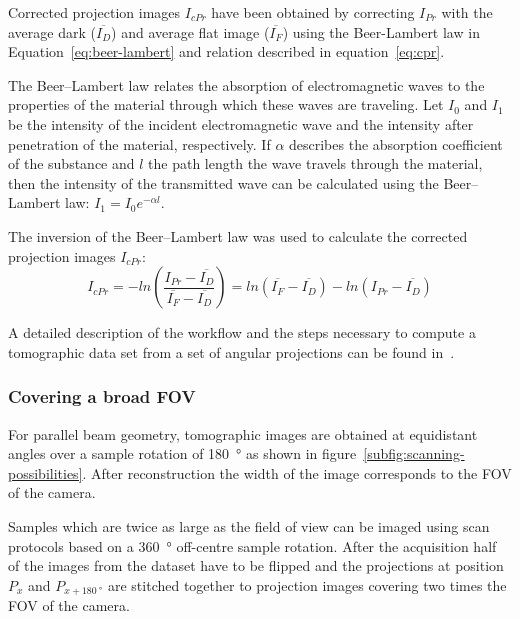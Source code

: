Corrected projection images $I_{cPr}$ have been obtained by correcting $I_{Pr}$ with the average dark ($\overline{I_{D}}$) and average flat image ($\overline{I_{F}}$) using the Beer-Lambert law in Equation~\ref{eq:beer-lambert} and relation described in equation~\ref{eq:cpr}.

The Beer--Lambert law relates the absorption of electromagnetic waves to the properties of the material through which these waves are traveling. Let $I_{0}$ and $I_{1}$ be the intensity of the incident electromagnetic wave and the intensity after penetration of the material, respectively. If $\alpha$ describes the absorption coefficient of the substance and $l$ the path length the wave travels through the material, then the intensity of the transmitted wave can be calculated using the Beer--Lambert law: \(I_{1}=I_{0}e^{-\alpha l}\label{eq:beer-lambert}\).

The inversion of the Beer--Lambert law was used to calculate the corrected projection images $I_{cPr}$:
\begin{equation}
	I_{cPr} = -ln\left(\frac{I_{Pr}-\overline{I_{D}}}{\overline{I_{F}}-\overline{I_{D}}}\right)
	= ln(\overline{I_{F}}-\overline{I_{D}})-ln(I_{Pr}-\overline{I_{D}})
	\label{eq:cpr}
\end{equation}

A detailed description of the workflow and the steps necessary to compute a tomographic data set from a set of angular projections can be found in~.

\subsubsection{Covering a broad FOV}%
\label{subsec:covering a broad fov}%
For parallel beam geometry, tomographic images are obtained at equidistant angles over a sample rotation of \SI{180}{\degree} as shown in figure~\ref{subfig:scanning-possibilities}. After reconstruction the width of the image corresponds to the FOV of the camera.

Samples which are twice as large as the field of view can be imaged using scan protocols based on a \SI{360}{\degree} off-centre sample rotation. After the acquisition half of the images from the dataset have to be flipped and the projections at position $P_{x}$ and $P_{x+\SI{180}{\degree}}$ are stitched together to projection images covering two times the FOV of the camera.

